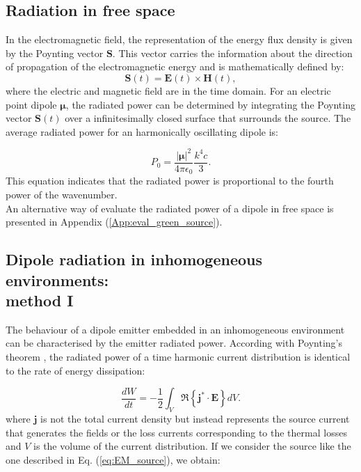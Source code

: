 \subsection{Radiation in free space}

In the electromagnetic field, the representation of the energy flux density is given by the Poynting vector $\mathbf{S}$. This vector carries the information about the direction of propagation of the electromagnetic energy and is mathematically defined by:
\begin{equation}
\mathbf{S}\left(t\right)=\mathbf{E}\left(t\right)\times\mathbf{H}\left(t\right),
\end{equation} 
where the electric and magnetic field are in the time domain. For an electric point dipole $\boldsymbol{\mu}$, the radiated power can be determined by integrating the Poynting vector $\mathbf{S}\left(t\right)$ over a infinitesimally closed surface that surrounds the source. The average radiated power for an harmonically oscillating dipole is:

\begin{equation}
P_{0}=\frac{\left|\mathbf{\boldsymbol{\mu}}\right|^2}{4\pi\epsilon_{0}}\frac{k^4c}{3}.
\end{equation}
This equation indicates that the radiated power is proportional to the fourth power of the wavenumber.\\
An alternative way of evaluate the radiated power of a dipole in free space is presented in Appendix (\ref{App:eval_green_source}).

\subsection{Dipole radiation in inhomogeneous environments: \\ method I \label{subch:Dip_inh_envi}}

The behaviour of a dipole emitter embedded in an inhomogeneous environment can be characterised by the emitter radiated power. According with Poynting's theorem \cite{Jackson_CE}, the radiated power of a time harmonic current distribution is identical to the rate of energy dissipation:

\begin{equation}
\frac{dW}{dt}=-\frac{1}{2}\int_V^{} \Re\left\{\mathbf{j}^{*}\cdot\mathbf{E}\right\} dV.
\end{equation}
where $\mathbf{j}$ is not the total current density but instead represents the source current that generates the fields or the loss currents corresponding to the thermal losses and $V$ is the volume of the current distribution. If we consider the source like the one described in Eq. (\ref{eq:EM_source}), we obtain:


